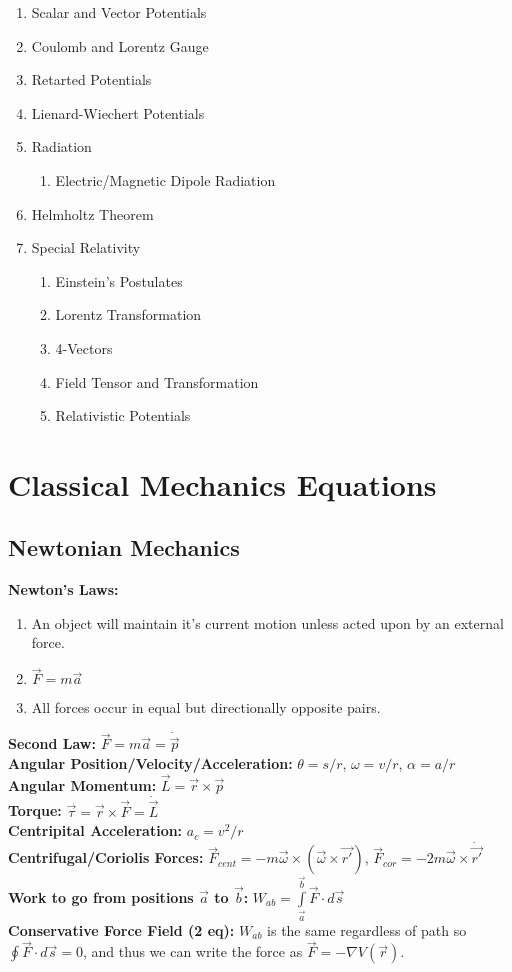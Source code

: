 \documentclass[12pt]{extarticle}
\begin{document}
\begin{enumerate}
  \item{Scalar and Vector Potentials}
  \item{Coulomb and Lorentz Gauge}
  \item{Retarted Potentials}
  \item{Lienard-Wiechert Potentials}
  \item{Radiation}
  \begin{enumerate}
    \item{Electric/Magnetic Dipole Radiation}
  \end{enumerate}
  \item{Helmholtz Theorem}
  \item{Special Relativity}
  \begin{enumerate}
    \item{Einstein's Postulates}
    \item{Lorentz Transformation}
    \item{4-Vectors}
    \item{Field Tensor and Transformation}
    \item{Relativistic Potentials}
  \end{enumerate}

\end{enumerate}

\newpage
\section{Classical Mechanics Equations}
\subsection*{Newtonian Mechanics}
\textbf{Newton's Laws:}
\begin{enumerate}
  \item{An object will maintain it's current motion unless acted upon by an external force.}
  \item{$\vec{F} = m\vec{a}$}
  \item{All forces occur in equal but directionally opposite pairs.}
\end{enumerate}
\textbf{Second Law:} $\vec{F} = m\vec{a} = \dot{\vec{p}}$ \\
\textbf{Angular Position/Velocity/Acceleration:} $\theta = s/r$, $\omega = v/r$, $\alpha = a/r$ \\
\textbf{Angular Momentum:} $\vec{L} = \vec{r} \times \vec{p}$ \\
\textbf{Torque:} $\vec{\tau} = \vec{r} \times \vec{F} = \dot{\vec{L}}$ \\
\textbf{Centripital Acceleration: } $a_c = v^2/r$ \\
\textbf{Centrifugal/Coriolis Forces: } $\vec{F}_{cent} = -m\vec{\omega} \times (\vec{\omega} \times \vec{r'})$, $\vec{F}_{cor} = -2m\vec{\omega} \times \dot{\vec{r'}}$ \\
\textbf{Work to go from positions $\vec{a}$ to $\vec{b}$:} $W_{ab} = \int\limits_{\vec{a}}^{\vec{b}} \vec{F} \cdot d\vec{s}$ \\
\textbf{Conservative Force Field (2 eq):} $W_{ab}$ is the same regardless of path so $\oint \vec{F} \cdot d\vec{s} = 0$, and thus we can write the force as $\vec{F} = -\nabla V(\vec{r})$.
\end{document}
